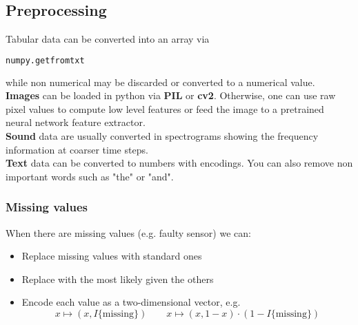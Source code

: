 \subsection{Preprocessing}
Tabular data can be converted into an array via 
\begin{lstlisting}[language=Python]
	numpy.getfromtxt
\end{lstlisting}
while non numerical may be discarded or converted to a numerical value.\\
\textbf{Images} can be loaded in python via \textbf{PIL} or \textbf{cv2}. Otherwise, one can use raw pixel values to compute low level features or feed the image to a pretrained neural network feature extractor.\\
\textbf{Sound} data are usually converted in spectrograms showing the frequency information at coarser time steps.\\
\textbf{Text} data can be converted to numbers with encodings. You can also remove non important words such as "the" or "and".
\subsubsection{Missing values}
When there are missing values (e.g. faulty sensor) we can:
\begin{itemize}
	\item Replace missing values with standard ones
	\item Replace with the most likely given the others
	\item Encode each value as a two-dimensional vector, e.g.
	\begin{equation*}
		x \mapsto (x, I\{\text{missing}\}) \quad\quad x \mapsto (x, 1 - x) \cdot (1- I\{\text{missing}\})
	\end{equation*}
\end{itemize}
